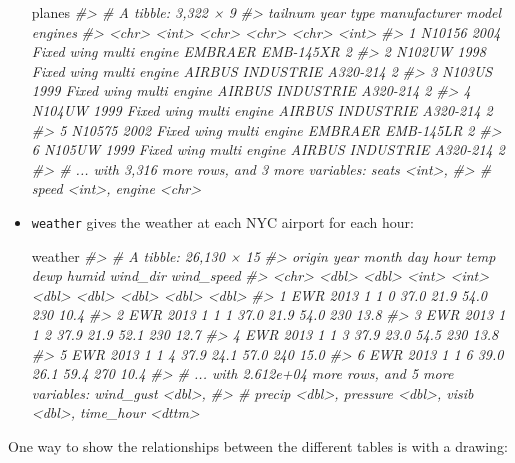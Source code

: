 \documentclass[]{book}
\newenvironment{Shaded}{\begin{snugshade}}{\end{snugshade}}
\newcommand{\CommentTok}[1]{\textcolor[rgb]{0.56,0.35,0.01}{\textit{{#1}}}}
\newcommand{\NormalTok}[1]{{#1}}
\begin{document}
\begin{itemize}
\begin{Shaded}
\begin{Highlighting}[]
\NormalTok{planes}
\CommentTok{#> # A tibble: 3,322 × 9}
\CommentTok{#>   tailnum  year                    type     manufacturer     model engines}
\CommentTok{#>     <chr> <int>                   <chr>            <chr>     <chr>   <int>}
\CommentTok{#> 1  N10156  2004 Fixed wing multi engine          EMBRAER EMB-145XR       2}
\CommentTok{#> 2  N102UW  1998 Fixed wing multi engine AIRBUS INDUSTRIE  A320-214       2}
\CommentTok{#> 3  N103US  1999 Fixed wing multi engine AIRBUS INDUSTRIE  A320-214       2}
\CommentTok{#> 4  N104UW  1999 Fixed wing multi engine AIRBUS INDUSTRIE  A320-214       2}
\CommentTok{#> 5  N10575  2002 Fixed wing multi engine          EMBRAER EMB-145LR       2}
\CommentTok{#> 6  N105UW  1999 Fixed wing multi engine AIRBUS INDUSTRIE  A320-214       2}
\CommentTok{#> # ... with 3,316 more rows, and 3 more variables: seats <int>,}
\CommentTok{#> #   speed <int>, engine <chr>}
\end{Highlighting}
\end{Shaded}
\item
  \texttt{weather} gives the weather at each NYC airport for each hour:

\begin{Shaded}
\begin{Highlighting}[]
\NormalTok{weather}
\CommentTok{#> # A tibble: 26,130 × 15}
\CommentTok{#>   origin  year month   day  hour  temp  dewp humid wind_dir wind_speed}
\CommentTok{#>    <chr> <dbl> <dbl> <int> <int> <dbl> <dbl> <dbl>    <dbl>      <dbl>}
\CommentTok{#> 1    EWR  2013     1     1     0  37.0  21.9  54.0      230       10.4}
\CommentTok{#> 2    EWR  2013     1     1     1  37.0  21.9  54.0      230       13.8}
\CommentTok{#> 3    EWR  2013     1     1     2  37.9  21.9  52.1      230       12.7}
\CommentTok{#> 4    EWR  2013     1     1     3  37.9  23.0  54.5      230       13.8}
\CommentTok{#> 5    EWR  2013     1     1     4  37.9  24.1  57.0      240       15.0}
\CommentTok{#> 6    EWR  2013     1     1     6  39.0  26.1  59.4      270       10.4}
\CommentTok{#> # ... with 2.612e+04 more rows, and 5 more variables: wind_gust <dbl>,}
\CommentTok{#> #   precip <dbl>, pressure <dbl>, visib <dbl>, time_hour <dttm>}
\end{Highlighting}
\end{Shaded}
\end{itemize}

One way to show the relationships between the different tables is with a
drawing:
\end{document}
